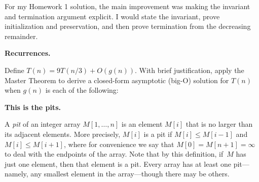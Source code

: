 \documentclass[11pt,addpoints,answers]{exam}
\begin{document}
\begin{questions}
  \begin{solution}
For my Homework 1 solution, the main improvement was making the invariant and termination argument explicit. I would state the invariant, prove initialization and preservation, and then prove termination from the decreasing remainder.
\end{solution}

     \question \textbf{Recurrences.} \nopagebreak
  
  Define $T(n)= 9T(n/3) + O(g(n))$.
  With brief justification, apply the Master Theorem to derive a closed-form asymptotic (big-O) solution for $T(n)$ when $g(n)$ is each of the following:



 \question[15] \textbf{This is the pits.} \nopagebreak

  A \emph{pit} of an integer array $M[1,\ldots, n]$ is an element $M[i]$ that is no larger than its adjacent elements.
  More precisely, $M[i]$ is a pit if $M[i] \leq M[i-1]$ and $M[i] \leq M[i+1]$, where for convenience we say that $M[0] = M[n+1] = \infty$ to deal with the endpoints of the array.
  Note that by this definition, if~$M$ has just one element, then that element is a pit.
  Every array has at least one pit---namely, any smallest element in the array---though there may be others.
    

\end{questions}
\end{document}
